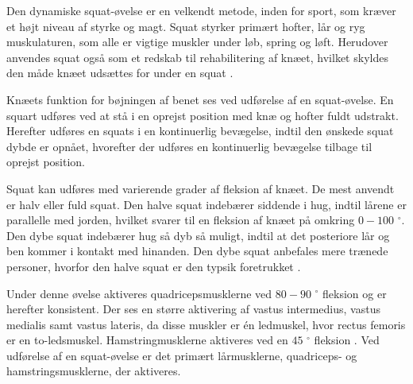 Den dynamiske squat-øvelse er en velkendt metode, inden for sport, som kræver et højt niveau af styrke og magt. Squat styrker primært hofter, lår og ryg muskulaturen, som alle er vigtige muskler under løb, spring og løft. Herudover anvendes squat også som et redskab til rehabilitering af knæet, hvilket skyldes den måde knæet udsættes for under en squat \citep{escamilla2001}. 

Knæets funktion for bøjningen af benet ses ved udførelse af en squat-øvelse. En squart udføres ved at stå i en oprejst position
med knæ og hofter fuldt udstrakt. Herefter udføres en
squats i en kontinuerlig bevægelse, indtil den ønskede squat
dybde er opnået, hvorefter der udføres en kontinuerlig bevægelse
tilbage til oprejst position.

Squat kan udføres med varierende grader af fleksion af knæet. De mest anvendt er halv eller fuld squat. Den halve squat indebærer siddende i hug, indtil lårene er parallelle med jorden, hvilket svarer til en fleksion af knæet på omkring $0-100$ $^{\circ}$. Den dybe squat indebærer hug så dyb så muligt, indtil at det posteriore lår og ben kommer i kontakt med hinanden. Den dybe squat anbefales mere trænede personer, hvorfor den halve squat er den typsik foretrukket \citep{escamilla2001}.

Under denne øvelse aktiveres quadricepsmusklerne ved $80-90$ $^{\circ}$ fleksion og er herefter konsistent. Der ses en større aktivering af vastus intermedius, vastus medialis samt vastus lateris, da disse muskler er én ledmuskel, hvor rectus femoris er en to-ledsmuskel. Hamstringmusklerne aktiveres ved en $45$ $^{\circ}$ fleksion \citep{schoenfeld2010}. 
Ved udførelse af en squat-øvelse er det primært lårmusklerne, quadriceps- og hamstringsmusklerne, der aktiveres. 